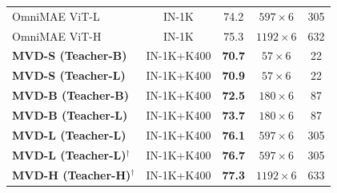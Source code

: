 \begin{enrichment}
\begin{enrichment}
\begin{table}[H]
{\begin{tabular}{lcccc}
                        OmniMAE ViT-L \cite{girdhar2023_omnimae} & IN-1K & 74.2 & $597{\times}6$ & 305 \\
                        OmniMAE ViT-H \cite{girdhar2023_omnimae} & IN-1K & 75.3 & $1192{\times}6$ & 632 \\
                        \midrule
                        \textbf{MVD-S (Teacher-B)} \cite{wang2023_mvd} & IN-1K+K400 & \textbf{70.7} & $57{\times}6$ & 22 \\
                        \textbf{MVD-S (Teacher-L)} \cite{wang2023_mvd} & IN-1K+K400 & \textbf{70.9} & $57{\times}6$ & 22 \\
                        \textbf{MVD-B (Teacher-B)} \cite{wang2023_mvd} & IN-1K+K400 & \textbf{72.5} & $180{\times}6$ & 87 \\
                        \textbf{MVD-B (Teacher-L)} \cite{wang2023_mvd} & IN-1K+K400 & \textbf{73.7} & $180{\times}6$ & 87 \\
                        \textbf{MVD-L (Teacher-L)} \cite{wang2023_mvd} & IN-1K+K400 & \textbf{76.1} & $597{\times}6$ & 305 \\
                        \textbf{MVD-L (Teacher-L)$^\dagger$} \cite{wang2023_mvd} & IN-1K+K400 & \textbf{76.7} & $597{\times}6$ & 305 \\
                        \textbf{MVD-H (Teacher-H)$^\dagger$} \cite{wang2023_mvd} & IN-1K+K400 & \textbf{77.3} & $1192{\times}6$ & 633 \\
                        \bottomrule
                \end{tabular}}
            \end{table}
            

\end{enrichment}
\end{enrichment}
